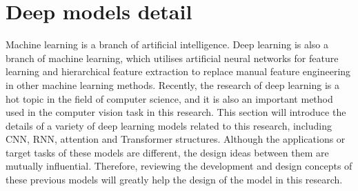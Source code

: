 \section{Deep models detail}
\label{sec:Deep models detail}
Machine learning is a branch of artificial intelligence. Deep learning is also a branch of machine learning, which utilises artificial neural networks for feature learning and hierarchical feature extraction to replace manual feature engineering in other machine learning methods.
Recently, the research of deep learning is a hot topic in the field of computer science, and it is also an important method used in the computer vision task in this research.
This section will introduce the details of a variety of deep learning models related to this research, including CNN, RNN, attention and Transformer structures.
Although the applications or target tasks of these models are different, the design ideas between them are mutually influential.
Therefore, reviewing the development and design concepts of these previous models will greatly help the design of the model in this research.



